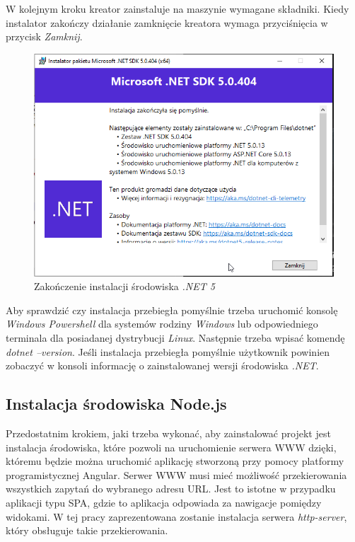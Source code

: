 \documentclass[a4paper,twoside,12pt]{book}
\begin{document}
W kolejnym kroku kreator zainstaluje na maszynie wymagane składniki. Kiedy instalator zakończy działanie zamknięcie kreatora wymaga przyciśnięcia w przycisk \textit{Zamknij}.

\begin{figure}[H]
	\centering
	\includegraphics[width=0.7\linewidth]{../zrzuty_ekranu/instalacja_dotnet5/dotnet_finish}
	\caption{Zakończenie instalacji środowiska \textit{.NET 5}}
	\label{fig:dotnetfinish}
\end{figure}

Aby sprawdzić czy instalacja przebiegła pomyślnie trzeba uruchomić konsolę \textit{Windows Powershell} dla systemów rodziny \textit{Windows} lub odpowiedniego terminala dla posiadanej dystrybucji \textit{Linux}. Następnie trzeba wpisać komendę \textit{dotnet --version}. Jeśli instalacja przebiegła pomyślnie użytkownik powinien zobaczyć w konsoli informację o zainstalowanej wersji środowiska \textit{.NET}.

\subsection{Instalacja środowiska Node.js}
Przedostatnim krokiem, jaki trzeba wykonać, aby zainstalować projekt jest instalacja środowiska, które pozwoli na uruchomienie serwera WWW dzięki, któremu będzie można uruchomić aplikację stworzoną przy pomocy platformy programistycznej Angular. Serwer WWW musi mieć możliwość przekierowania wszystkich zapytań do wybranego adresu URL. Jest to istotne w przypadku aplikacji typu SPA, gdzie to aplikacja odpowiada za nawigacje pomiędzy widokami. W tej pracy zaprezentowana zostanie instalacja serwera \textit{http-server}, który obsługuje takie przekierowania.
\end{document}
